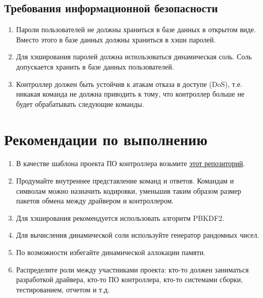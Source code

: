 \documentclass[14pt]{extarticle}
\begin{document}
\subsection{Требования информационной безопасности}

\begin{enumerate}

 \item Пароли пользователей не должны храниться в базе данных в открытом виде.
  Вместо этого в базе данных должны храниться в хэши паролей.

 \item Для хэширования паролей должна использоваться динамическая соль.
  Соль допускается хранить в базе данных пользователей.

 \item Контроллер должен быть устойчив к атакам отказа в доступе (DoS), т.е.
  никакая команда не должна приводить к тому, что контроллер больше не будет
  обрабатывать следующие команды.

\end{enumerate}

\section{Рекомендации по выполнению}

\begin{enumerate}

 \item В качестве шаблона проекта ПО контроллера возьмите
  \href{https://github.com/czertyaka/blackpill-usb-sha256}{этот репозиторий}.

 \item Продумайте внутреннее представление команд и ответов.
  Командам и символам можно назначить кодировки, уменьшив таким образом размер
  пакетов обмена между драйвером и контроллером.

 \item Для хэширования рекомендуется использовать алгоритм PBKDF2\footnotemark{}.


 \item Для вычисления динамической соли используйте генератор рандомных чисел\footnotemark{}.


 \item По возможности избегайте динамической аллокации памяти.

 \item Распределите роли между участниками проекта: кто-то должен заниматься
  разработкой драйвера, кто-то ПО контроллера, кто-то системами сборки, тестированием,
  отчетом и т.д.

\end{enumerate}
\end{document}
